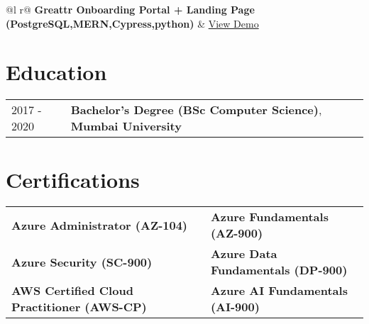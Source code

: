 \documentclass[a4paper,10pt]{article}  %
\begin{document}
\begin{tabularx}{\linewidth}{ @{}l r@{} }
\textbf{Greattr Onboarding Portal + Landing Page (PostgreSQL,MERN,Cypress,python)} & \hfill \href{https://www.greattr.com}{View Demo} \\[3.75pt]
\end{tabularx}


\section{Education}
\begin{tabularx}{\linewidth}{@{}l X@{}}	
2017 - 2020 & \textbf{Bachelor's Degree (BSc Computer Science)}, \textbf{Mumbai University} \\ 
\end{tabularx}

\section{Certifications}
\begin{tabularx}{\linewidth}{@{}l X l@{}}
\textbf{Azure Administrator (AZ-104)} & & \textbf{Azure Fundamentals (AZ-900)} \\
\textbf{Azure Security (SC-900)} & & \textbf{Azure Data Fundamentals (DP-900)} \\
\textbf{AWS Certified Cloud Practitioner (AWS-CP)} & & \textbf{Azure AI Fundamentals (AI-900)} \\
\end{tabularx}
\end{document}
